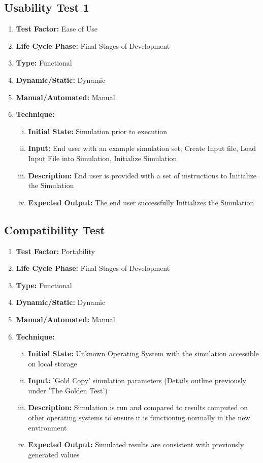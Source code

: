 \documentclass[paper=letter, fontsize=10pt]{scrartcl}
\numberwithin{equation}{section}		%
\numberwithin{figure}{section}			%
\numberwithin{table}{section}				%
\begin{document}
\subsection{Usability Test 1}
\begin{enumerate}[]
	\item \textbf{Test Factor:} Ease of Use
	\item \textbf{Life Cycle Phase:} Final Stages of Development
	\item \textbf{Type:} Functional
	\item \textbf{Dynamic/Static:} Dynamic
	\item \textbf{Manual/Automated:} Manual
	\item \textbf{Technique:}
		\begin{enumerate}[(i)]
			\item \textbf{Initial State:} Simulation prior to execution  
			\item \textbf{Input:} End user with an example simulation set; Create Input file, Load Input File into Simulation, Initialize Simulation
			\item \textbf{Description:} End user is provided with a set of instructions to Initialize the Simulation 
			\item \textbf{Expected Output:} The end user successfully Initializes the Simulation
		\end{enumerate}
\end{enumerate}

\subsection{Compatibility Test}
\begin{enumerate}[] 
	\item \textbf{Test Factor:} Portability 
	\item \textbf{Life Cycle Phase:} Final Stages of Development
	\item \textbf{Type:} Functional
	\item \textbf{Dynamic/Static:} Dynamic
	\item \textbf{Manual/Automated:} Manual
	\item \textbf{Technique:}
		\begin{enumerate}[(i)]
			\item \textbf{Initial State:} Unknown Operating System with the simulation accessible on local storage  
			\item \textbf{Input:} 'Gold Copy' simulation parameters (Details outline previously under 'The Golden Test')
			\item \textbf{Description:} Simulation is run and compared to results computed on other operating systems to ensure it is functioning normally in the new environment
			\item \textbf{Expected Output:} Simulated results are consistent with previously generated values
		\end{enumerate}
\end{enumerate}
\end{document}
